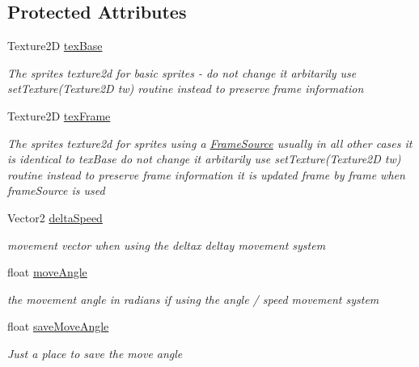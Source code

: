 \subsection*{Protected Attributes}
\begin{DoxyCompactItemize}
\item 
Texture2D \mbox{\hyperlink{class_r_c___framework_1_1_sprite3_ac69869c54b541f68ac23464874a4e91f}{tex\+Base}}
\begin{DoxyCompactList}\small\item\em The sprites texture2d for basic sprites -\/ do not change it arbitarily use set\+Texture(\+Texture2\+D tw) routine instead to preserve frame information \end{DoxyCompactList}\item 
Texture2D \mbox{\hyperlink{class_r_c___framework_1_1_sprite3_a5b3ed08cfae3aba31834ad0c16c98ed3}{tex\+Frame}}
\begin{DoxyCompactList}\small\item\em The sprites texture2d for sprites using a \mbox{\hyperlink{class_r_c___framework_1_1_frame_source}{Frame\+Source}} usually in all other cases it is identical to tex\+Base do not change it arbitarily use set\+Texture(\+Texture2\+D tw) routine instead to preserve frame information it is updated frame by frame when frame\+Source is used \end{DoxyCompactList}\item 
Vector2 \mbox{\hyperlink{class_r_c___framework_1_1_sprite3_a085b269f8bcef70e2e90cc6473d6d9f0}{delta\+Speed}}
\begin{DoxyCompactList}\small\item\em movement vector when using the deltax deltay movement system \end{DoxyCompactList}\item 
float \mbox{\hyperlink{class_r_c___framework_1_1_sprite3_a21a2dd7d771adeacb93f54e16c70809a}{move\+Angle}}
\begin{DoxyCompactList}\small\item\em the movement angle in radians if using the angle / speed movement system \end{DoxyCompactList}\item 
float \mbox{\hyperlink{class_r_c___framework_1_1_sprite3_a0bc61dcdb25da53eca3d470d1156e2a3}{save\+Move\+Angle}}
\begin{DoxyCompactList}\small\item\em Just a place to save the move angle \end{DoxyCompactList}\item 

\end{DoxyCompactItemize}
